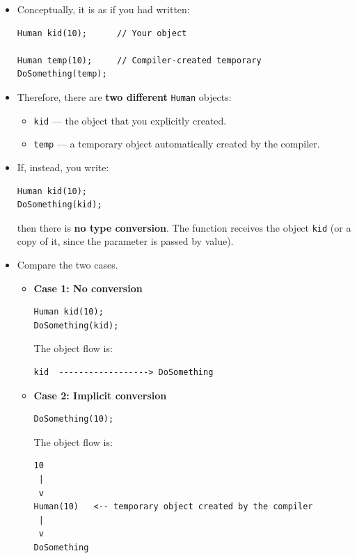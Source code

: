 \documentclass[10pt]{article}
\begin{document}
\begin{itemize}
\begin{itemize}
    \item Conceptually, it is as if you had written:

\begin{verbatim}
Human kid(10);      // Your object

Human temp(10);     // Compiler-created temporary
DoSomething(temp);
\end{verbatim}

    \item Therefore, there are \textbf{two different} \verb|Human| objects:
    \begin{itemize}
        \item \verb|kid| --- the object that you explicitly created.
        \item \verb|temp| --- a temporary object automatically created by the compiler.
    \end{itemize}

    \item If, instead, you write:

\begin{verbatim}
Human kid(10);
DoSomething(kid);
\end{verbatim}

    then there is \textbf{no type conversion}. The function receives the object
    \verb|kid| (or a copy of it, since the parameter is passed by value).

    \item Compare the two cases.

    \begin{itemize}
        \item \textbf{Case 1: No conversion}

\begin{verbatim}
Human kid(10);
DoSomething(kid);
\end{verbatim}

        The object flow is:

\begin{verbatim}
kid  ------------------> DoSomething
\end{verbatim}

        \item \textbf{Case 2: Implicit conversion}

\begin{verbatim}
DoSomething(10);
\end{verbatim}

        The object flow is:

\begin{verbatim}
10
 |
 v
Human(10)   <-- temporary object created by the compiler
 |
 v
DoSomething
\end{verbatim}
    \end{itemize}


\end{itemize}
\end{itemize}
\end{document}
